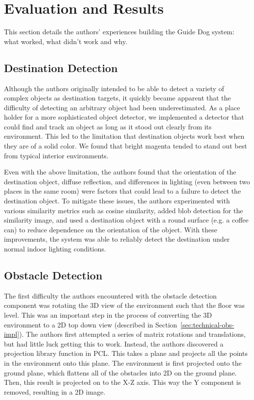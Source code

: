 \section{Evaluation and Results}
\label{sec:eval}

This section details the authors' experiences building the Guide Dog system:
what worked, what didn't work and why.

\subsection{Destination Detection}
\label{sec:eval-dest}

Although the authors originally intended to be able to detect a variety
of complex objects as destination targets, it quickly became apparent that
the difficulty of detecting an arbitrary object had been underestimated.
As a place holder for a more sophisticated object detector, we implemented
a detector that could find and track an object as long as it stood out
clearly from its environment. This led to the limitation that
destination objects work best when they are of a solid color. We found
that bright magenta tended to stand out best from typical interior
environments. 

Even with the above limitation, the authors found that the orientation
of the destination object, diffuse reflection, and differences in lighting
(even between two places in the same room) were factors that could lead
to a failure to detect the destination object. To mitigate these issues,
the authors experimented with various similarity metrics such as cosine
similarity, added blob detection for the similarity image, and used a
destination object with a round surface (e.g. a coffee can) to reduce
dependence on the orientation of the object. With these improvements,
the system was able to reliably detect the destination under normal
indoor lighting conditions. 


\subsection{Obstacle Detection}
\label{sec:eval-obs}

The first difficulty the authors encountered with the obstacle detection
component was rotating the 3D view of the environment such that the floor was
level. This was an important step in the process of converting the 3D
environment to a 2D top down view (described in
Section~\ref{sec:technical-obs-impl}). The authors first attempted a series of
matrix rotations and translations, but had little luck getting this to work.
Instead, the authors discovered a projection library function in PCL. This takes
a plane and projects all the points in the environment onto this plane. The
environment is first projected onto the ground plane, which flattens all of the
obstacles into 2D on the ground plane. Then, this result is projected on to the
X-Z axis. This way the Y component is removed, resulting in a 2D image.

